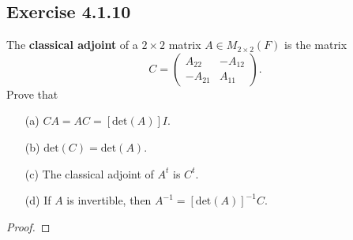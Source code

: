 \subsection*{Exercise 4.1.10} The \textbf{classical adjoint} of a \( 2 \times 2  \) matrix \( A \in {M}_{2 \times 2}(F)  \) is the matrix 
\[  C = \begin{pmatrix}
    {A}_{22} & - {A}_{12} \\
    - {A}_{21} & {A}_{11}
\end{pmatrix}. \]
Prove that
\begin{enumerate}
    \item[(a)] \( CA = AC = [\text{det}(A)] I. \)
    \item[(b)] \( \text{det}(C) = \text{det}(A) \).
    \item[(c)] The classical adjoint of \( A^{t} \) is \( C^{t} \).
    \item[(d)] If \( A  \) is invertible, then \( A^{-1} = [\text{det}(A)]^{-1} C \).
\end{enumerate}

\begin{proof}

\end{proof}
